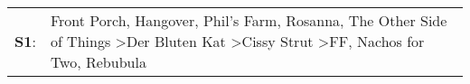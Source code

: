 \begin{supertabular}{p{0.03\textwidth}p{0.92\textwidth}}
 \textbf{S1}:  &  Front Porch\textsuperscript{}, \enspace Hangover\textsuperscript{}, \enspace Phil's Farm\textsuperscript{}, \enspace Rosanna\textsuperscript{}, \enspace The Other Side of Things\textsuperscript{} \textgreater \enspace Der Bluten Kat\textsuperscript{} \textgreater \enspace Cissy Strut\textsuperscript{} \textgreater \enspace FF\textsuperscript{}, \enspace Nachos for Two\textsuperscript{}, \enspace Rebubula\textsuperscript{}  \enspace  \\
\end{supertabular}
